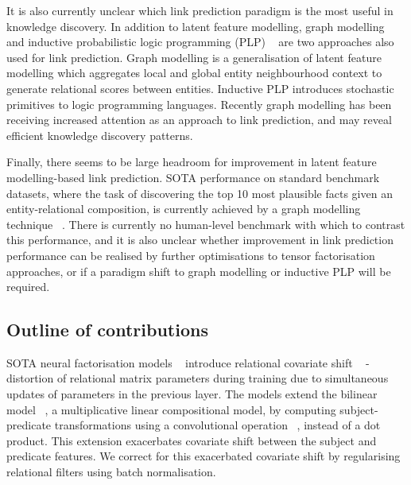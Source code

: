 \noindent It is also currently unclear which link prediction paradigm is the most useful in knowledge discovery. In addition to latent feature modelling, graph modelling \unskip~\citep{niepert2016discriminative, schlichtkrull2018modeling, pinter2018predicting} and inductive probabilistic logic programming (PLP) \unskip~\citep{yang2017differentiable, speichert2018learning} are two approaches also used for link prediction. Graph modelling is a generalisation of latent feature modelling which aggregates local and global entity neighbourhood context to generate relational scores between entities. Inductive PLP introduces stochastic primitives to logic programming languages. Recently graph modelling has been receiving increased attention as an approach to link prediction, and may reveal efficient knowledge discovery patterns. \par

\noindent Finally, there seems to be large headroom for improvement in latent feature modelling-based link prediction. SOTA performance on standard benchmark datasets, where the task of discovering the top 10 most plausible facts given an entity-relational composition, is currently achieved by a graph modelling technique \unskip~\citep{ruderNLPProg}. There is currently no human-level benchmark with which to contrast this performance, and it is also unclear whether improvement in link prediction performance can be realised by further optimisations to tensor factorisation approaches, or if a paradigm shift to graph modelling or inductive PLP will be required.  

\subsection{Outline of contributions}

SOTA neural factorisation models \unskip~\citep{balazevic2019hypernetwork, dettmers2018convolutional} introduce relational covariate shift \unskip~\citep{ioffe2015batch} - distortion of relational matrix parameters during training due to simultaneous updates of parameters in the previous layer. The models extend the bilinear model \unskip~\citep{jenatton2012latent}, a multiplicative linear compositional model, by computing subject-predicate transformations using a convolutional operation \unskip~\citep{zeiler2014visualizing}, instead of a dot product. This extension exacerbates covariate shift between the subject and predicate features. We correct for this exacerbated covariate shift by regularising relational filters using batch normalisation. \par


